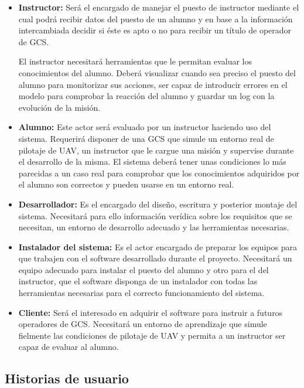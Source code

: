 \documentclass[12pt,a4paper,spanish]{book} %
\begin{document}
\begin{itemize}
\item\textbf{Instructor:} Será el encargado de manejar el puesto de instructor mediante el cual podrá recibir datos del puesto de un alumno y en base a la información intercambiada decidir si éste es apto o no para recibir un título de operador de GCS.

El instructor necesitará herramientas que le permitan evaluar los conocimientos del alumno. Deberá visualizar cuando sea preciso el puesto del alumno para monitorizar sus acciones, ser capaz de introducir errores en el modelo para comprobar la reacción del alumno y guardar un log con la evolución de la misión.

\item\textbf{Alumno:} Este actor será evaluado por un instructor haciendo uso del sistema. Requerirá disponer de una GCS que simule un entorno real de pilotaje de UAV, un instructor que le cargue una misión y supervise durante el desarrollo de la misma. El sistema deberá tener unas condiciones lo más parecidas a un caso real para comprobar que los conocimientos adquiridos por el alumno son correctos y pueden usarse en un entorno real.

\item\textbf{Desarrollador:} Es el encargado del diseño, escritura y posterior montaje del sistema. Necesitará para ello información verídica sobre los requisitos que se necesitan, un entorno de desarrollo adecuado y las herramientas necesarias.

\item\textbf{Instalador del sistema:} Es el actor encargado de preparar los equipos para que trabajen con el software desarrollado durante el proyecto. Necesitará un equipo adecuado para instalar el puesto del alumno y otro para el del instructor, que el software disponga de un instalador con todas las herramientas necesarias para el correcto funcionamiento del sistema.

\item\textbf{Cliente:} Será el interesado en adquirir el software para instruir a futuros operadores de GCS. Necesitará un entorno de aprendizaje que simule fielmente las condiciones de pilotaje de UAV y permita a un instructor ser capaz de evaluar al alumno.

\end{itemize}

\subsection{Historias de usuario}
\end{document}
